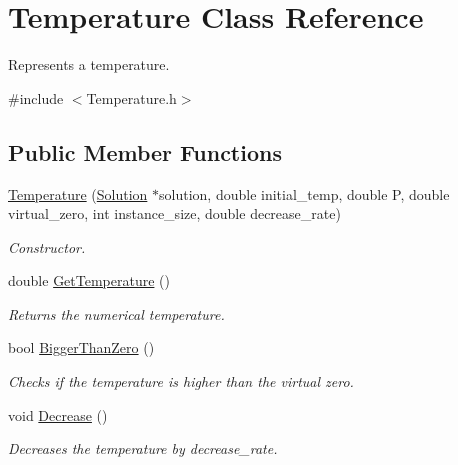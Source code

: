 \hypertarget{classTemperature}{}\section{Temperature Class Reference}
\label{classTemperature}


Represents a temperature.  




{\ttfamily \#include $<$Temperature.\+h$>$}

\subsection*{Public Member Functions}
\begin{DoxyCompactItemize}
\item 
\hyperlink{classTemperature_a1f573ff95291d6331a6922a40490b85e}{Temperature} (\hyperlink{classSolution}{Solution} $\ast$solution, double initial\+\_\+temp, double P, double virtual\+\_\+zero, int instance\+\_\+size, double decrease\+\_\+rate)
\begin{DoxyCompactList}\small\item\em Constructor. \end{DoxyCompactList}\item 
\mbox{\label{classTemperature_acc5c59a5b71da4f38e38b433ad1b1254}} 
double \hyperlink{classTemperature_acc5c59a5b71da4f38e38b433ad1b1254}{Get\+Temperature} ()
\begin{DoxyCompactList}\small\item\em Returns the numerical temperature. \end{DoxyCompactList}\item 
bool \hyperlink{classTemperature_a3907a3b46c4fcf5db8e59d96d5439fc8}{Bigger\+Than\+Zero} ()
\begin{DoxyCompactList}\small\item\em Checks if the temperature is higher than the virtual zero. \end{DoxyCompactList}\item 
\mbox{\label{classTemperature_ae4f317aaec64e36b59176d9e75252d92}} 
void \hyperlink{classTemperature_ae4f317aaec64e36b59176d9e75252d92}{Decrease} ()
\begin{DoxyCompactList}\small\item\em Decreases the temperature by decrease\+\_\+rate. \end{DoxyCompactList}\end{DoxyCompactItemize}


